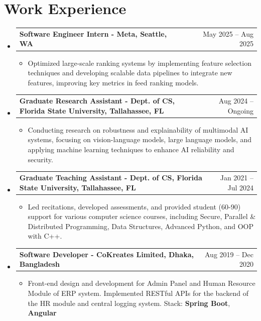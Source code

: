 \documentclass[letterpaper,10.5pt]{article}
\makeatletter
\newcommand{\resumeWorkSubheading}[4]{
  \vspace{-1pt}\item
    \begin{tabular*}{0.97\textwidth}{l@{\extracolsep{\fill}}r}
      \textbf{#1} & #2 \\
    \end{tabular*}\vspace{-1pt} %
}
\newcommand{\resumeSubHeadingListStart}{\begin{itemize}[label=,leftmargin=*, parsep=3pt]}
\newcommand{\resumeSubHeadingListEnd}{\end{itemize}}
\newcommand{\resumeItemListStart}{\begin{itemize}[label=\textbullet]}
\newcommand{\resumeItemListEnd}{\end{itemize}\vspace{0pt}}
\makeatother
\begin{document}
\section{Work Experience}
  \resumeSubHeadingListStart

    \resumeWorkSubheading
      {Software Engineer Intern \textnormal{- Meta, Seattle, WA }}{May 2025 -- Aug 2025}
      {}{}
      \resumeItemListStart
        \item Optimized large-scale ranking systems by implementing feature selection techniques and developing scalable data pipelines to integrate new features, improving key metrics in feed ranking models.  
      \resumeItemListEnd
      \vspace{-8pt}

    \resumeWorkSubheading
      {Graduate Research Assistant \textnormal{- Dept. of CS, Florida State University, Tallahassee, FL }}{Aug 2024 -- Ongoing}
      {}{}
      \resumeItemListStart
        \item Conducting research on robustness and explainability of multimodal AI systems, focusing on vision-language models, large language models, and applying machine learning techniques to enhance AI reliability and security.
      \resumeItemListEnd
      \vspace{-8pt}
    \resumeWorkSubheading
      {Graduate Teaching Assistant \textnormal{- Dept. of CS, Florida State University, Tallahassee, FL }}{Jan 2021 -- Jul 2024}
      {}{}
      \resumeItemListStart
        \item Led recitations, developed assessments, and provided student (60-90) support for various computer science courses, including Secure, Parallel \& Distributed Programming, Data Structures, Advanced Python, and OOP with C++.
      \resumeItemListEnd
      \vspace{-8pt}
       \resumeWorkSubheading
          {Software Developer \textnormal{- CoKreates Limited, Dhaka, Bangladesh } }{Aug 2019 -- Dec 2020}
          {CoKreates Limited, Dhaka, Bangladesh}{}
          \resumeItemListStart
 \item Front-end design and development for Admin Panel and Human Resource Module of ERP system. Implemented RESTful APIs for the backend of the HR module and central logging system. Stack: \textbf{Spring Boot}, \textbf{Angular}
          \resumeItemListEnd
  \resumeSubHeadingListEnd




\end{document}
